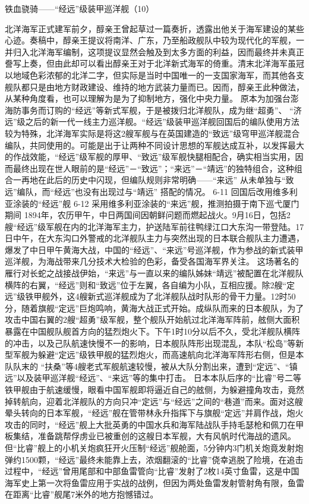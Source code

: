 \documentclass[12pt,UTF8]{ctexbook}
\begin{document}
铁血骁骑——“经远”级装甲巡洋舰（10）

北洋海军正式建军前夕，醇亲王曾起草过一篇奏折，透露出他关于海军建设的某些心迹。奏稿中，醇亲王提议将南洋、广东，乃至船政舰队中较为现代化的军舰，一并归入北洋海军编制，这项提议显然会触及到太多方面的利益，因而最终并未真正誊写上奏，但由此却可以看出醇亲王对于北洋新式海军的倚重。清末北洋海军虽冠以地域色彩浓郁的北洋二字，但实际是当时中国唯一的一支国家海军，而其他各支舰队都只是由地方财政建设、维持的地方武装力量而已。因而，醇亲王此种做法，从某种角度看，也可以理解为是为了抑制地方，强化中央力量。
原本为加强台澎海防事务而订购的“经远”等新式军舰，于是被拨归北洋舰队，成为继“超勇”、 “济远”级之后的新一代一线主力巡洋舰。“经远”级装甲巡洋舰回国后的编队使用方法较为特殊，北洋海军实际是将这2艘军舰与在英国建造的“致远”级穹甲巡洋舰混合编队，共同使用的。可能是出于让两种不同设计思想的军舰达成互补，以发挥最大的作战效能，“经远”级军舰的厚甲、“致远”级军舰快腿相配合，确实相当实用，因而最终出现在世人眼前的是“经远”－“致远”；“来远”－“靖远”的独特组合，这种组合一再地在此后的历史中闪现，但编队规则非常明确——“来远” 从未单独与“致远”编队，而“经远”也没有出现过与“靖远” 搭配的情况。
6-11 回国后改用维多利亚涂装的“经远”舰
6-12 采用维多利亚涂装的“来远”舰，推测拍摄于南下巡弋厦门期间
1894年，农历甲午，中日两国间因朝鲜问题而燃起战火。9月16日，包括2艘“经远”级军舰在内的北洋海军主力，护送陆军前往鸭绿江口大东沟一带登陆。17日中午，在大东沟口外警戒的北洋舰队主力与突然出现的日本联合舰队主力遭遇，爆发了中日甲午黄海大战，中国的“经远”、“来远”号巡洋舰，作为参战的新式装甲巡洋舰，为海战带来几分技术大检验的色彩，备受各国海军界关注。
这场著名的雁行对长蛇之战接战伊始，“来远”与一直以来的编队姊妹“靖远”被配置在北洋舰队横阵的右翼，“经远”则和“致远”位于左翼，各自编为小队，互相应援。除2艘“定远”级铁甲舰外，这4艘新式巡洋舰成为了北洋舰队战时队形的骨干力量。12时50分，随着旗舰“定远”巨炮鸣响，黄海大战正式开始。成纵队而来的日本舰队，为了攻击中国右翼的2艘“超勇”级军舰，整个舰队开始航过北洋海军阵前，舷侧大面积暴露在中国舰队舰首方向的猛烈炮火下。下午1时10分以后不久，受北洋舰队横阵的冲击，以及己队航速快慢不一的影响，日本舰队阵形出现混乱，本队“松岛”等新型军舰为躲避“定远”级铁甲舰的猛烈炮火，而高速航向北洋海军阵形右侧，但是本队队末的 “扶桑”等4艘老式军舰航速较慢，被从大队分割出来，遭到“定远”、“镇远”以及装甲巡洋舰“经远”、“来远”等的集中打击。
日本本队后序的“比睿”号二等铁甲舰由于航速缓慢，眼看中国军舰即将逼近自己的舷侧，为躲避撞角攻击，竟然掉转航向，迎着北洋舰队的方向只冲“定远”与“经远”之间的“巷道”而来。面对这艘晕头转向的日本军舰，“经远”舰在管带林永升指挥下与旗舰“定远”并肩作战，炮火攻击的同时，“经远”舰上大批英勇的中国水兵和海军陆战队手持毛瑟枪和佩刀在甲板集结，准备跳帮俘虏业已被重创的这艘日本军舰，大有风帆时代海战的遗风。但“比睿”舰上的小机关炮疯狂开火压制“经远”舰舱面，5分钟内3门机关炮竟发射炮弹约1500颗，“经远”最终未能靠上去，浓烟翻滚的“比睿”侥幸逃脱了险境，在追击过程中，“经远”曾用尾部和中部鱼雷管向“比睿”发射了2枚14英寸鱼雷，这是中国海军史上第一次将鱼雷应用于实战的战例，但因为两处鱼雷发射管射角有限，鱼雷在距离“比睿”舰尾7米外的地方抱憾错过。
\end{document}
